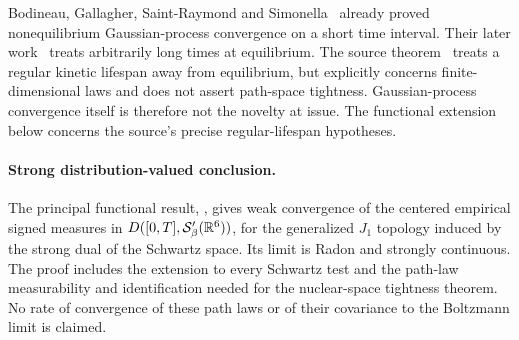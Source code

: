 Bodineau, Gallagher, Saint-Raymond and Simonella~\cite{BGSS} already proved
nonequilibrium Gaussian-process convergence on a short time interval.
Their later work~\cite{BGSSeq} treats arbitrarily long times at equilibrium.
The source theorem~\cite{U} treats a regular kinetic lifespan away from
equilibrium, but explicitly concerns finite-dimensional laws and does not
assert path-space tightness. Gaussian-process convergence itself is
therefore not the novelty at issue. The functional extension below concerns
the source's precise regular-lifespan hypotheses.

\paragraph{Strong distribution-valued conclusion.}
The principal functional result, , gives weak convergence
of the centered empirical signed measures in
$D([0,T],\mathcal S'_\beta(\mathbb R^6))$, for the generalized $J_1$ topology
induced by the strong dual of the Schwartz space. Its limit is Radon and
strongly continuous. The proof includes the extension to every Schwartz
test and the path-law measurability and identification needed for the
nuclear-space tightness theorem. No rate of convergence of these path laws
or of their covariance to the Boltzmann limit is claimed.
